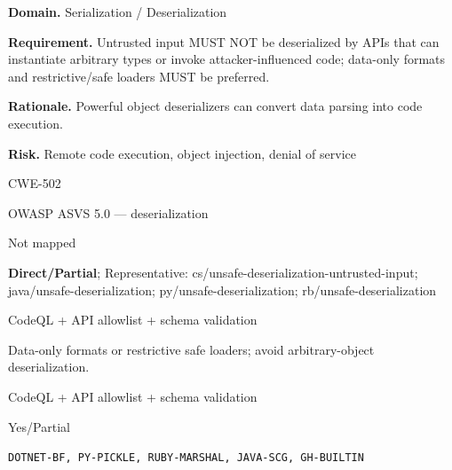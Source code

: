 \documentclass[10pt,letterpaper]{article}
\newcommand{\prioritybadge}[2]{\tcbox[on line,boxrule=0pt,arc=1.2mm,boxsep=0.7mm,left=1mm,right=1mm,top=0.4mm,bottom=0.4mm,colback=#2!12,coltext=#2]{\scriptsize\bfseries #1}}
\begin{document}
\begin{rulebox}[title={\texttt{SCS-ALL-DESER-001} \hfill \prioritybadge{Critical Control}{Critical}}]
\textbf{Domain.} Serialization / Deserialization

\textbf{Requirement.} Untrusted input MUST NOT be deserialized by APIs that can instantiate arbitrary types or invoke attacker-influenced code; data-only formats and restrictive/safe loaders MUST be preferred.

\textbf{Rationale.} Powerful object deserializers can convert data parsing into code execution.

\textbf{Risk.} Remote code execution, object injection, denial of service

\begin{description}[leftmargin=2.65cm,labelwidth=2.3cm,style=nextline,itemsep=1pt,topsep=3pt]
  \item[CWE] CWE-502
  \item[OWASP] OWASP ASVS 5.0 --- deserialization
  \item[CERT] Not mapped
  \item[CodeQL] {\raggedright\textbf{Direct/Partial}; Representative: cs/\allowbreak unsafe-deserialization-untrusted-input; java/\allowbreak unsafe-deserialization; py/\allowbreak unsafe-deserialization; rb/\allowbreak unsafe-deserialization\par}
  \item[Enforcement] CodeQL + API allowlist + schema validation
  \item[Prevention] Data-only formats or restrictive safe loaders; avoid arbitrary-object deserialization.
  \item[Verification] CodeQL + API allowlist + schema validation
  \item[Automation] Yes/Partial
  \item[Sources] \texttt{DOTNET-BF, PY-PICKLE, RUBY-MARSHAL, JAVA-SCG, GH-BUILTIN}
\end{description}
\end{rulebox}
\end{document}
